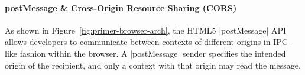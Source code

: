 

\paragraph{postMessage \& Cross-Origin Resource Sharing (CORS)}

As shown in Figure~\ref{fig:primer-browser-arch}, the HTML5
\js|postMessage| API~\cite{webmessaging} allows developers to
communicate between contexts of different origins in IPC-like fashion
within the browser. A \js|postMessage| sender specifies the intended
origin of the recipient, and only a context with that origin may read
the message.
%
%


